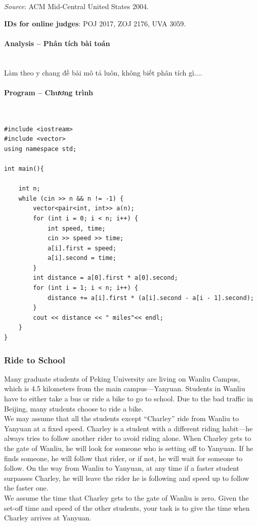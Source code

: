 \documentclass{article}
\begin{document}
\textit{Source}: ACM Mid-Central United States 2004.

\textbf{IDs for online judges}: POJ 2017, ZOJ 2176, UVA 3059.


\paragraph{Analysis -- Phân tích bài toán} \mbox{} \\

Làm theo y chang đề bài mô tả luôn, không biết phân tích gì....

\paragraph{Program -- Chương trình} \mbox{} \\


\begin{lstlisting}
#include <iostream>
#include <vector>
using namespace std;

int main(){
	
	int n; 
	while (cin >> n && n != -1) {
		vector<pair<int, int>> a(n);
		for (int i = 0; i < n; i++) {
			int speed, time;
			cin >> speed >> time;
			a[i].first = speed;
			a[i].second = time;
		}
		int distance = a[0].first * a[0].second;
		for (int i = 1; i < n; i++) {
			distance += a[i].first * (a[i].second - a[i - 1].second);
		}
		cout << distance << " miles"<< endl;
	}
}

\end{lstlisting}


\subsubsection{Ride to School}
Many graduate students of Peking University are living on Wanliu Campus, which is 4.5 kilometers from the main campus—Yanyuan. Students in Wanliu have to either take a bus or ride a bike to go to school. Due to the bad traffic in Beijing, many students choose to ride a bike. \\
We may assume that all the students except “Charley” ride from Wanliu to Yanyuan at a fixed speed. Charley is a student with a different riding habit—he always tries to follow another rider to avoid riding alone. When Charley gets to the gate of Wanliu, he will look for someone who
is setting off to Yanyuan. If he finds someone, he will follow that rider, or if not, he will wait for someone to follow. On the way from Wanliu to Yanyuan, at any time if a faster student surpasses Charley, he will leave the rider he is following and speed up to follow the faster one. \\
We assume the time that Charley gets to the gate of Wanliu is zero. Given the set-off time and speed of the other students, your task is to give the time when Charley arrives at Yanyuan.
\end{document}
